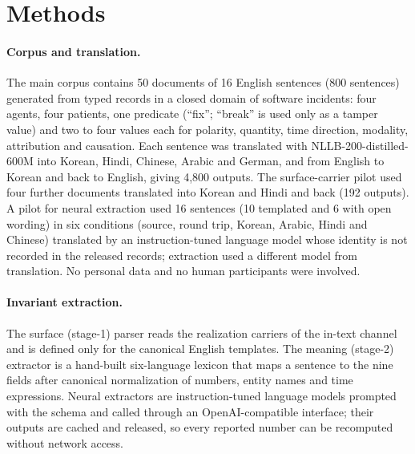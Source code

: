 \documentclass[12pt]{article}
\begin{document}
\clearpage
\section*{Methods}

\paragraph{Corpus and translation.} The main corpus contains 50 documents of 16 English sentences (800 sentences) generated from typed records in a closed domain of software incidents: four agents, four patients, one predicate (``fix''; ``break'' is used only as a tamper value) and two to four values each for polarity, quantity, time direction, modality, attribution and causation. Each sentence was translated with NLLB-200-distilled-600M\cite{nllb2024} into Korean, Hindi, Chinese, Arabic and German, and from English to Korean and back to English, giving 4,800 outputs. The surface-carrier pilot used four further documents translated into Korean and Hindi and back (192 outputs). A pilot for neural extraction used 16 sentences (10 templated and 6 with open wording) in six conditions (source, round trip, Korean, Arabic, Hindi and Chinese) translated by an instruction-tuned language model whose identity is not recorded in the released records; extraction used a different model from translation. No personal data and no human participants were involved.

\paragraph{Invariant extraction.} The surface (stage-1) parser reads the realization carriers of the in-text channel and is defined only for the canonical English templates. The meaning (stage-2) extractor is a hand-built six-language lexicon that maps a sentence to the nine fields after canonical normalization of numbers, entity names and time expressions. Neural extractors are instruction-tuned language models prompted with the schema and called through an OpenAI-compatible interface; their outputs are cached and released, so every reported number can be recomputed without network access.
\end{document}
